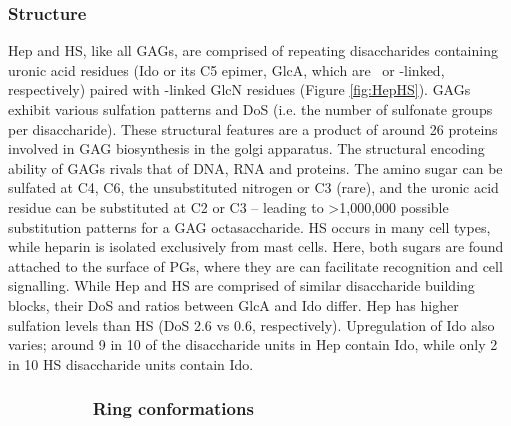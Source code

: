 \documentclass[journal=jctcce,manuscript=article]{achemso}
\begin{document}
{\subsubsection{Structure}\label{structure}
\ac{Hep} and \ac{HS}, like all \acp{GAG}, are comprised of repeating disaccharides containing uronic acid residues (\ac{Ido} or its C5 epimer, \ac{GlcA}, which are \textalpha~or  -linked, respectively) paired with -linked \ac{GlcN} residues (Figure \ref{fig:HepHS}). \cite{Capila2002Heparin-proteinInteractions., Gandhi2008TheProteins, Casu2005StructureHeparin}
\acp{GAG} exhibit various sulfation patterns and \ac{DoS} (i.e. the number of sulfonate groups per disaccharide). These structural features are a product of around 26 proteins involved in \ac{GAG} biosynthesis in the golgi apparatus.\cite{SoaresdaCosta2017SulfationDisorders, Varki2009BiologicalGlycans}
The structural encoding ability of \acp{GAG} rivals that of DNA, RNA and proteins.\cite{Gama2006SulfationActivity} 
The amino sugar can be sulfated at C4, C6, the unsubstituted nitrogen or C3 (rare), and the uronic acid residue can be substituted at C2 or C3 -- leading to \textgreater1,000,000 possible substitution patterns for a \ac{GAG} octasaccharide.\cite{Gandhi2008TheProteins, SoaresdaCosta2017SulfationDisorders,Gama2006SulfationActivity} 
\ac{HS} occurs in many cell types, while heparin is isolated exclusively from mast cells.\cite{Liu2014ChemoenzymaticHeparin., Gandhi2008TheProteins}
Here, both sugars are found attached to the surface of \acp{PG}, where they are can facilitate recognition and cell signalling. \cite{Capila2002Heparin-proteinInteractions., Gandhi2008TheProteins, Casu2005StructureHeparin}
While \ac{Hep} and \ac{HS} are comprised of similar disaccharide building blocks, their \ac{DoS} and ratios between \ac{GlcA} and \ac{Ido} differ. \cite{Capila2002Heparin-proteinInteractions., Gandhi2008TheProteins, Casu2005StructureHeparin}
\ac{Hep} has higher sulfation levels than HS (\ac{DoS} 2.6 vs 0.6, respectively). \cite{Nahain2018HeparinActivity, Avci2003SyntheticProperties, }
Upregulation of \ac{Ido} also varies; around 9 in 10 of the disaccharide units in \ac{Hep} contain \ac{Ido}, while only 2 in 10 \ac{HS} disaccharide units contain \ac{Ido}. \cite{Capila2002Heparin-proteinInteractions., Gandhi2008TheProteins, Casu2005StructureHeparin}

\subsubsection*{~~~~~~~~~Ring conformations}

}
\end{document}
